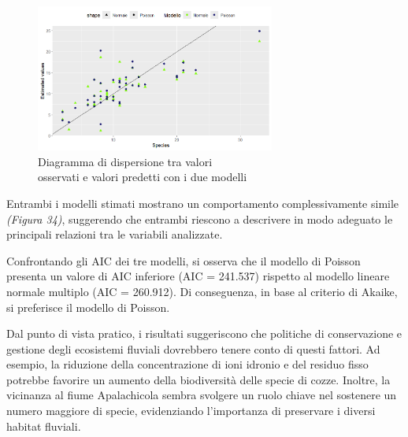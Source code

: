 \documentclass{article} %
\begin{document}
\begin{figure}[H]
    \centering
    \includegraphics[width=0.7\textwidth]{immagini/lm_glm.png}
    \captionsetup{justification=centering}
    \caption{Diagramma di dispersione tra valori \\osservati e valori predetti con i due modelli}
\end{figure}

Entrambi i modelli stimati mostrano un comportamento complessivamente simile \textit{(Figura 34)}, suggerendo che entrambi riescono a descrivere in modo adeguato le principali relazioni tra le variabili analizzate.

Confrontando gli AIC dei tre modelli, si osserva che il modello di Poisson presenta un valore di AIC inferiore (AIC = 241.537) rispetto al modello lineare normale multiplo (AIC = 260.912). Di conseguenza, in base al criterio di Akaike, si preferisce il modello di Poisson.

Dal punto di vista pratico, i risultati suggeriscono che politiche di conservazione e gestione degli ecosistemi fluviali dovrebbero tenere conto di questi fattori. Ad esempio, la riduzione della concentrazione di ioni idronio e del residuo fisso potrebbe favorire un aumento della biodiversità delle specie di cozze. Inoltre, la vicinanza al fiume Apalachicola sembra svolgere un ruolo chiave nel sostenere un numero maggiore di specie, evidenziando l'importanza di preservare i diversi habitat fluviali.
\end{document}
